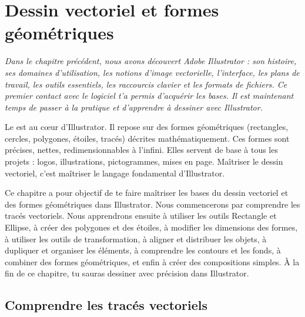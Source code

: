 
\chapter{Dessin vectoriel et formes géométriques}

\noindent
\textit{Dans le chapitre précédent, nous avons découvert Adobe Illustrator : son histoire, ses domaines d'utilisation, les notions d'image vectorielle, l'interface, les plans de travail, les outils essentiels, les raccourcis clavier et les formats de fichiers. Ce premier contact avec le logiciel t'a permis d'acquérir les bases. Il est maintenant temps de passer à la pratique et d'apprendre à dessiner avec Illustrator.}

\vspace{1em}

\noindent
Le  est au cœur d'Illustrator. Il repose sur des formes géométriques (rectangles, cercles, polygones, étoiles, tracés) décrites mathématiquement. Ces formes sont précises, nettes, redimensionnables à l'infini. Elles servent de base à tous les projets : logos, illustrations, pictogrammes, mises en page. Maîtriser le dessin vectoriel, c'est maîtriser le langage fondamental d'Illustrator.

\vspace{1em}

\noindent
Ce chapitre a pour objectif de te faire maîtriser les bases du dessin vectoriel et des formes géométriques dans Illustrator. Nous commencerons par comprendre les tracés vectoriels. Nous apprendrons ensuite à utiliser les outils Rectangle et Ellipse, à créer des polygones et des étoiles, à modifier les dimensions des formes, à utiliser les outils de transformation, à aligner et distribuer les objets, à dupliquer et organiser les éléments, à comprendre les contours et les fonds, à combiner des formes géométriques, et enfin à créer des compositions simples. À la fin de ce chapitre, tu sauras dessiner avec précision dans Illustrator.

\section{Comprendre les tracés vectoriels}

